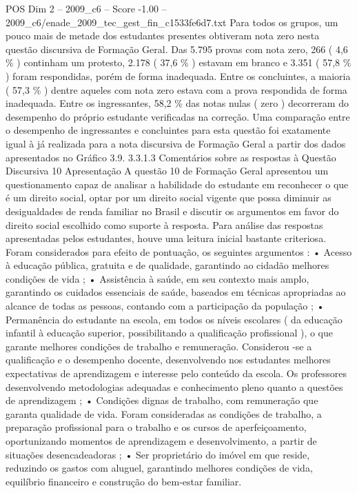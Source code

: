 \begin{textsample}{POS Dim 2 – 2009\_c6 – Score -1.00 – 2009\_c6/enade\_2009\_tec\_gest\_fin\_c1533fe6d7.txt}
Para todos os grupos, um pouco mais de metade dos estudantes presentes obtiveram nota zero nesta questão discursiva de Formação Geral.
Das 5.795 provas com nota zero, 266 ( 4,6 \% ) continham um protesto, 2.178 ( 37,6 \% ) estavam em branco e 3.351 ( 57,8 \% ) foram respondidas, porém de forma inadequada.
Entre os concluintes, a maioria ( 57,3 \% ) dentre aqueles com nota zero estava com a prova respondida de forma inadequada.
Entre os ingressantes, 58,2 \% das notas nulas ( zero ) decorreram do desempenho do próprio estudante verificadas na correção.
Uma comparação entre o desempenho de ingressantes e concluintes para esta questão foi exatamente igual à já realizada para a nota discursiva de Formação Geral a partir dos dados apresentados no Gráfico 3.9. 3.3.1.3 Comentários sobre as respostas à Questão Discursiva 10 Apresentação A questão 10 de Formação Geral apresentou um questionamento capaz de analisar a habilidade do estudante em reconhecer o que é um direito social, optar por um direito social vigente que possa diminuir as desigualdades de renda familiar no Brasil e discutir os argumentos em favor do direito social escolhido como suporte à resposta.
Para análise das respostas apresentadas pelos estudantes, houve uma leitura inicial bastante criteriosa.
Foram considerados para efeito de pontuação, os seguintes argumentos : • Acesso à educação pública, gratuita e de qualidade, garantindo ao cidadão melhores condições de vida ; • Assistência à saúde, em seu contexto mais amplo, garantindo os cuidados essenciais de saúde, baseados em técnicas apropriadas ao alcance de todas as pessoas, contando com a participação da população ; • Permanência do estudante na escola, em todos os níveis escolares ( da educação infantil à educação superior, possibilitando a qualificação profissional ), o que garante melhores condições de trabalho e remuneração.
Considerou -se a qualificação e o desempenho docente, desenvolvendo nos estudantes melhores expectativas de aprendizagem e interesse pelo conteúdo da escola.
Os professores desenvolvendo metodologias adequadas e conhecimento pleno quanto a questões de aprendizagem ; • Condições dignas de trabalho, com remuneração que garanta qualidade de vida.
Foram consideradas as condições de trabalho, a preparação profissional para o trabalho e os cursos de aperfeiçoamento, oportunizando momentos de aprendizagem e desenvolvimento, a partir de situações desencadeadoras ; • Ser proprietário do imóvel em que reside, reduzindo os gastos com aluguel, garantindo melhores condições de vida, equilíbrio financeiro e construção do bem-estar familiar.

\end{textsample}
